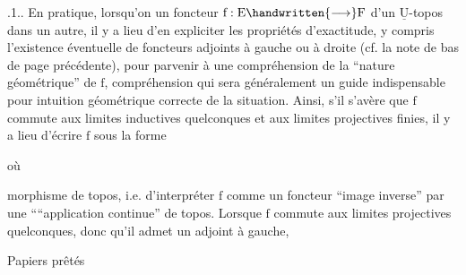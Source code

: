 .1.. En pratique, lorsqu'on un foncteur $\mathrm{f}:\mathrm{E}\handwritten{\longrightarrow}\mathrm{F}$ d'un $\underline{\mathrm{U}}$-topos dans un autre, il y a lieu d'en expliciter  les propriétés d'exactitude,  y compris l'existence éventuelle de foncteurs adjoints à gauche ou à droite (cf. la note de bas de page précédente), pour parvenir à une compréhension de la ``nature géométrique'' de $\mathrm{f}$,  compréhension qui sera généralement un guide indispensable pour intuition géométrique correcte de la situation. Ainsi, s'il s'avère que $\mathrm{f}$ commute aux limites inductives quelconques et aux limites projectives finies, il y a lieu d'écrire $\mathrm{f}$ sous la forme
où
morphisme de topos, i.e. d'interpréter $\mathrm{f}$ comme un foncteur ``image inverse'' par une ````application continue'' de topos. Lorsque $\mathrm{f}$ commute aux limites projectives quelconques, donc qu'il admet un adjoint à gauche,


\noindent\hfill Papiers prêtés




